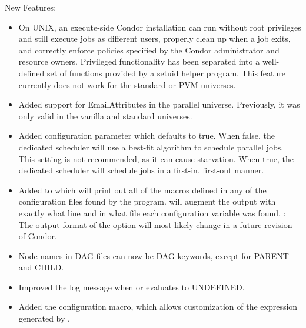 \noindent New Features:

\begin{itemize}
\item On UNIX, an execute-side Condor installation can run without
root privileges and still execute jobs as different users, properly
clean up when a job exits, and correctly enforce policies specified by
the Condor administrator and resource owners. Privileged functionality
has been separated into a well-defined set of functions provided by a
setuid helper program. This feature currently does not work for the
standard or PVM universes.


\item Added support for EmailAttributes in the parallel universe.  
Previously, it was only valid in the vanilla and standard universes.

\item Added configuration parameter 
which defaults to true.  When false, the dedicated scheduler will
use a best-fit algorithm to schedule parallel jobs.  This setting is
not recommended, as it can cause starvation.  When true, the dedicated
scheduler will schedule jobs in a first-in, first-out manner.

\item Added  to  which will print out
all of the macros defined in any of the configuration files found by
the program.
   will augment the output
with exactly what line and in what file each configuration variable
was found.
\Note: The output format of the  option will most likely
change in a future revision of Condor.

\item Node names in  DAG files can now be DAG
keywords, except for PARENT and CHILD.

\item Improved the log message when  or
 evaluates to UNDEFINED.

\item Added the  configuration macro,
which allows customization of the  expression
generated by .


\end{itemize}
